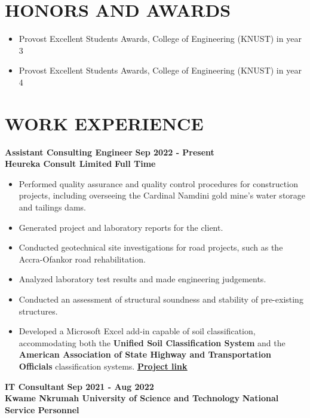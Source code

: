 \documentclass[letterpaper, 12pt]{article}
\newcommand{\cvsection}[1]{
	
	\section*{#1}
}
\newcommand{\verticalSpace}{4pt}
\begin{document}
	
	\cvsection{HONORS AND AWARDS}
	
	\begin{itemize}[leftmargin=*]
		
		\item Provost Excellent Students Awards, College of Engineering (KNUST) in year 3
		\item Provost Excellent Students Awards, College of Engineering (KNUST) in year 4
		
	\end{itemize}
	
	
	\cvsection{WORK EXPERIENCE}
	
	\textbf{Assistant Consulting Engineer} \hfill \textbf{Sep 2022 - Present} \\ [\verticalSpace]
	\textbf{Heureka Consult Limited} \hfill \textbf{Full Time}
	
	\begin{itemize}[leftmargin=*]
		
		\item Performed quality assurance and quality control procedures for construction projects, including overseeing the Cardinal Namdini gold mine's water storage and tailings dams.
		\item Generated project and laboratory reports for the client.
		\item Conducted geotechnical site investigations for road projects, such as the Accra-Ofankor road rehabilitation.		
		\item Analyzed laboratory test results and made engineering judgements.
		\item Conducted an assessment of structural soundness and stability of pre-existing structures.
		\item Developed a Microsoft Excel add-in capable of soil classification, accommodating both the \textbf{Unified Soil Classification System} and the \textbf{American Association of State Highway and Transportation Officials} classification systems.	\href{https://github.com/patrickboateng/geolab/tree/main/geolab-excel-addin}{\underline{\textbf{Project link}}} \\
		
	\end{itemize}
	
	\textbf{IT Consultant} \hfill \textbf{Sep 2021 - Aug 2022} \\ [\verticalSpace]
	\textbf{Kwame Nkrumah University of Science and Technology} \hfill \textbf{National Service Personnel}
	
\end{document}
